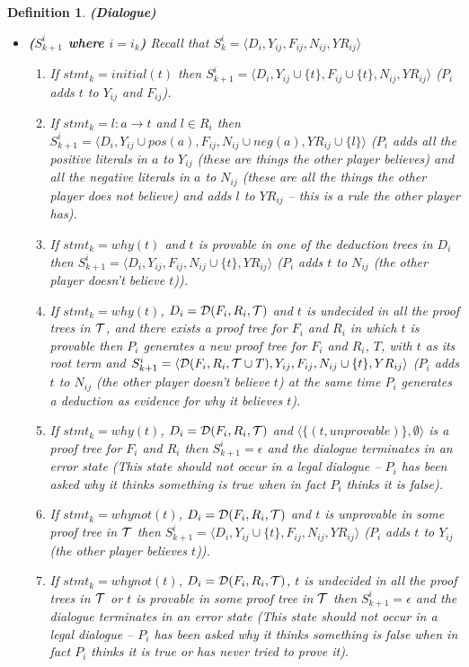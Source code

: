 \documentclass{blue-book}
\newtheorem{definition}{Definition}
\newcommand{\drule}[3]{\ensuremath{#1:#2 \rightarrow #3}}
\newcommand{\node}[2]{\ensuremath{(#1, #2)}}
\newcommand{\deduction}[3]{\ensuremath{{\cal D}(#1, #2, #3)}}
\begin{document}
\begin{definition}{\bf (Dialogue)}
\begin{itemize}
\item  {\bf ($S^i_{k+1}$ where $i = i_k$)} Recall that $S^i_k =  \langle D_i, Y_{ij}, F_{ij}, N_{ij}, YR_{ij} \rangle$
\begin{enumerate}
\item If $stmt_k = initial(t)$ then $S^i_{k+1}= \langle D_i, Y_{ij} \cup \{t\}, F_{ij} \cup \{t\}, N_{ij}, YR_{ij} \rangle$ 
($P_i$ adds $t$ to $Y_{ij}$ and $F_{ij}$).  
\item If $stmt_k = \drule{l}{a}{t}$ and $l  \in R_i$ then $S^i_{k + 1} = \langle D_i, Y_{ij} \cup pos(a), F_{ij}, N_{ij} \cup neg(a), YR_{ij} \cup \{l\} \rangle$
($P_i$ adds all the positive literals in $a$ to $Y_{ij}$ (these are things the other player believes) and all the negative literals in $a$ to $N_{ij}$ (these are all the things the other player does not believe) and adds $l$ to $YR_{ij}$ -- this is a rule the other player has). 
\item If $stmt_k = why(t)$ and $t$ is provable in one of the deduction trees in $D_i$ then $S^i_{k + 1} = \langle D_i, Y_{ij}  , F_{ij}, N_{ij} \cup \{t\}, YR_{ij} \rangle$ ($P_i$ adds $t$ to $N_{ij}$ (the other player doesn't believe $t$)). 
\item If $stmt_k = why(t)$, $D_i = \deduction{F_i}{R_i}{{\cal T}}$ and $t$ is undecided in all the proof trees in ${\cal T}$, and there exists a proof tree for $F_i$ and $R_i$ in which $t$ is provable then $P_i$ generates a new proof tree for $F_i$ and $R_i$, $T$, with $t$ as its root term and  $S^i_{k + 1} = \langle \deduction{F_i}{R_i}{{\cal T} \cup T}, Y_{ij}  , F_{ij}, N_{ij} \cup \{t\}, YR_{ij} \rangle$ ($P_i$ adds $t$ to $N_{ij}$ (the other player doesn't believe $t$) at the same time $P_i$ generates a deduction as evidence for why it believes $t$). 
\item If $stmt_k = why(t)$, $D_i = \deduction{F_i}{R_i}{{\cal T}}$ and $\langle \{\node{t}{unprovable}\}, \emptyset \rangle$ is a proof tree for $F_i$ and $R_i$ then  $S^i_{k + 1} = \epsilon$ and the dialogue terminates in an error state (This state should not occur in a legal dialogue -- $P_i$ has been asked why it thinks something is true when in fact $P_i$ thinks it is false).
\item If $stmt_k = whynot(t)$, $D_i = \deduction{F_i}{R_i}{{\cal T}}$ and $t$ is unprovable in some proof tree in ${\cal T}$ then $S^i_{k + 1} = \langle D_i, Y_{ij} \cup \{t\}, F_{ij}, N_{ij} , YR_{ij} \rangle$  ($P_i$ adds $t$ to $Y_{ij}$ (the other player believes $t$)). 
\item If $stmt_k = whynot(t)$, $D_i = \deduction{F_i}{R_i}{{\cal T}}$, $t$ is undecided in all the proof trees in ${\cal T}$ or $t$ is provable in some proof tree in ${\cal T}$ then  $S^i_{k + 1} = \epsilon$ and the dialogue terminates in an error state (This state should not occur in a legal dialogue -- $P_i$ has been asked why it thinks something is false when in fact $P_i$ thinks it is true or has never tried to prove it).
\end{enumerate}


\end{itemize}
\end{definition}
\end{document}
